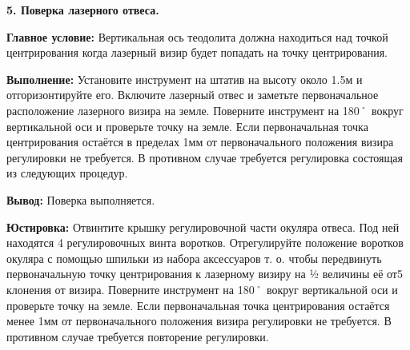 \documentclass[a4paper]{article}
\begin{document}
\begin{newpage}
{}
\large{
    \par\textbf{5. Поверка лазерного отвеса.}
    \par\textbf{Главное условие:} Вертикальная ось теодолита должна находиться над точкой центрирования когда лазерный визир будет попадать на точку центрирования.
    \par\textbf{Выполнение:} Установите инструмент на штатив на высоту около 1.5м и отгоризонтируйте его. Включите лазерный отвес и заметьте первоначальное расположение лазерного визира на земле. Поверните инструмент на 180˚ вокруг вертикальной оси и проверьте точку на земле. Если первоначальная точка центрирования остаётся в пределах 1мм от первоначального положения визира регулировки не требуется. В противном случае требуется регулировка состоящая из следующих процедур.
    \par\textbf{Вывод:} Поверка выполняется.
    \par\textbf{Юстировка:} Отвинтите крышку регулировочной части окуляра отвеса. Под ней находятся 4 регулировочных винта воротков. Отрегулируйте положение воротков окуляра с помощью шпильки из набора аксессуаров т. о. чтобы передвинуть первоначальную точку центрирования к лазерному визиру на ½ величины её от5 клонения от визира. Поверните инструмент на 180˚ вокруг вертикальной оси и проверьте точку на земле. Если первоначальная точка центрирования остаётся менее 1мм от первоначального положения визира регулировки не требуется. В противном случае требуется повторение регулировки.
}

\end{newpage}
\end{document}
